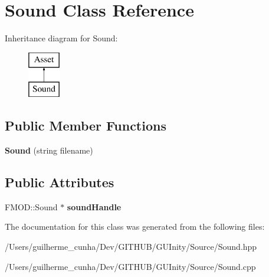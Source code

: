 \hypertarget{class_sound}{}\section{Sound Class Reference}
\label{class_sound}
Inheritance diagram for Sound\+:\begin{figure}[H]
\begin{center}
\leavevmode
\includegraphics[height=2.000000cm]{class_sound}
\end{center}
\end{figure}
\subsection*{Public Member Functions}
\begin{DoxyCompactItemize}
\item 
\hypertarget{class_sound_aa621785a9569bcd0724a7498c287b10d}{}{\bfseries Sound} (string filename)\label{class_sound_aa621785a9569bcd0724a7498c287b10d}

\end{DoxyCompactItemize}
\subsection*{Public Attributes}
\begin{DoxyCompactItemize}
\item 
\hypertarget{class_sound_acd62674bebee2a659ba2d9bc0e84114f}{}F\+M\+O\+D\+::\+Sound $\ast$ {\bfseries sound\+Handle}\label{class_sound_acd62674bebee2a659ba2d9bc0e84114f}

\end{DoxyCompactItemize}


The documentation for this class was generated from the following files\+:\begin{DoxyCompactItemize}
\item 
/\+Users/guilherme\+\_\+cunha/\+Dev/\+G\+I\+T\+H\+U\+B/\+G\+U\+Inity/\+Source/Sound.\+hpp\item 
/\+Users/guilherme\+\_\+cunha/\+Dev/\+G\+I\+T\+H\+U\+B/\+G\+U\+Inity/\+Source/Sound.\+cpp\end{DoxyCompactItemize}
